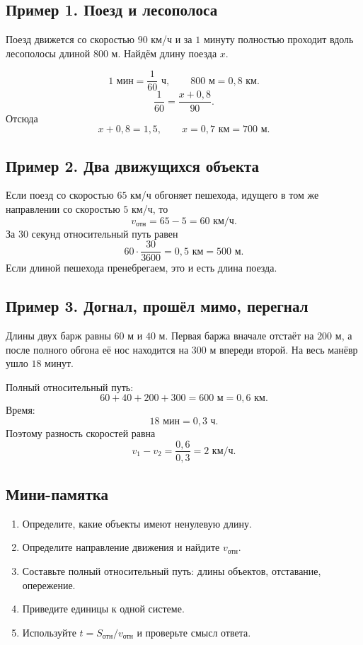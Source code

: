 \documentclass[a4paper,12pt]{article}
\begin{document}
\subsection*{Пример 1. Поезд и лесополоса}
Поезд движется со скоростью $90$ км/ч и за $1$ минуту полностью проходит вдоль лесополосы длиной $800$ м. Найдём длину поезда $x$.

\[
1\text{ мин}=\frac1{60}\text{ ч},\qquad 800\text{ м}=0,8\text{ км}.
\]
\[
\frac1{60}=\frac{x+0,8}{90}.
\]
Отсюда
\[
x+0,8=1,5,\qquad x=0,7\text{ км}=700\text{ м}.
\]

\subsection*{Пример 2. Два движущихся объекта}
Если поезд со скоростью $65$ км/ч обгоняет пешехода, идущего в том же направлении со скоростью $5$ км/ч, то
\[
v_{\text{отн}}=65-5=60\text{ км/ч}.
\]
За $30$ секунд относительный путь равен
\[
60\cdot\frac{30}{3600}=0,5\text{ км}=500\text{ м}.
\]
Если длиной пешехода пренебрегаем, это и есть длина поезда.

\subsection*{Пример 3. Догнал, прошёл мимо, перегнал}
Длины двух барж равны $60$ м и $40$ м. Первая баржа вначале отстаёт на $200$ м, а после полного обгона её нос находится на $300$ м впереди второй. На весь манёвр ушло $18$ минут.

Полный относительный путь:
\[
60+40+200+300=600\text{ м}=0,6\text{ км}.
\]
Время:
\[
18\text{ мин}=0,3\text{ ч}.
\]
Поэтому разность скоростей равна
\[
\boxed{v_1-v_2=\frac{0,6}{0,3}=2\text{ км/ч}}.
\]

\subsection*{Мини-памятка}
\begin{enumerate}
  \item Определите, какие объекты имеют ненулевую длину.
  \item Определите направление движения и найдите $v_{\text{отн}}$.
  \item Составьте полный относительный путь: длины объектов, отставание, опережение.
  \item Приведите единицы к одной системе.
  \item Используйте $t=S_{\text{отн}}/v_{\text{отн}}$ и проверьте смысл ответа.
\end{enumerate}
\end{document}

